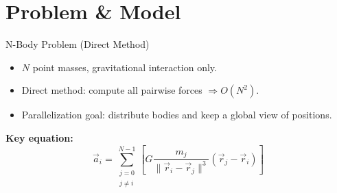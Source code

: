 \documentclass{beamer}
\begin{document}
\section{Problem \& Model}
\begin{frame}{N-Body Problem (Direct Method)}
  \begin{itemize}
    \item $N$ point masses, gravitational interaction only.
    \item Direct method: compute all pairwise forces $\Rightarrow O(N^2)$.
    \item Parallelization goal: distribute bodies and keep a global view of positions.
  \end{itemize}
  \vspace{0.5em}
  \textbf{Key equation:}
  \[
    \vec{a}_i=\sum_{\substack{j=0 \\ j \neq i}}^{N-1}
    \left[G\frac{m_j}{\|\vec{r}_i-\vec{r}_j\|^3}(\vec{r}_j-\vec{r}_i)\right]
  \]
\end{frame}
\end{document}
